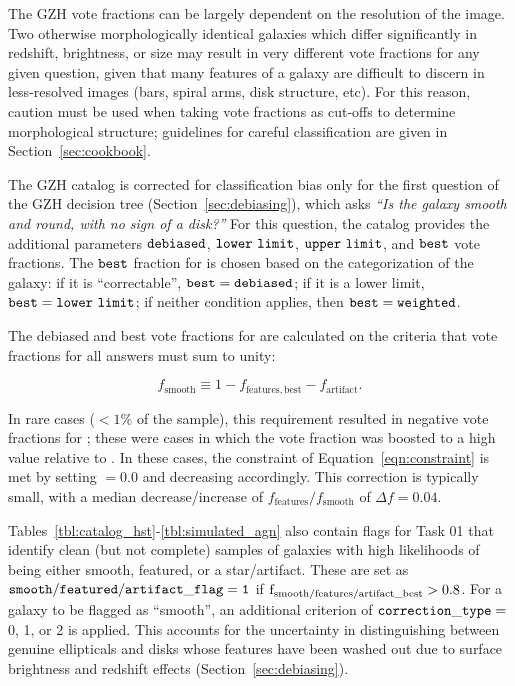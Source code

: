 \documentclass[twocolumn]{aastex6}
\begin{document}
The GZH vote fractions can be largely dependent on the resolution of the image.
Two otherwise morphologically identical galaxies which differ significantly in
redshift, brightness, or size may result in very different vote fractions for
any given question, given that many features of a galaxy are difficult to
discern in less-resolved images (bars, spiral arms, disk structure, etc). For
this reason, caution must be used when taking vote fractions as cut-offs to
determine morphological structure; guidelines for careful classification are
given in Section~\ref{sec:cookbook}. 

The GZH catalog is corrected for classification bias only for the first
question of the GZH decision tree (Section~\ref{sec:debiasing}), which asks
{\it ``Is the galaxy smooth and round, with no sign of a disk?''} For this
question, the catalog provides the additional parameters $\tt debiased$, $\tt
lower~limit$, $\tt upper~limit$, and $\tt best$ vote fractions. The $\tt best$
fraction for \ffeatures{} is chosen based on the categorization of the galaxy:
if it is ``correctable'', $\tt best = debiased$; if it is a lower limit, $\tt
best = lower~limit$; if neither condition applies, then $\tt best = weighted$.

The debiased and best vote fractions for \fsmooth{} are calculated on the
criteria that vote fractions for all answers must sum to unity:

\begin{equation}
f_\mathrm{smooth} \equiv 1 - f_\mathrm{features,best} - f_\mathrm{artifact}.
\label{eqn:constraint}
\end{equation}

\noindent In rare cases ($<1\%$ of the sample), this requirement resulted in
negative vote fractions for \fsmooth; these were cases in which the
\ffeatures{} vote fraction was boosted to a high value relative to \fartifact.
In these cases, the constraint of Equation~\ref{eqn:constraint} is met by
setting \fsmooth$=0.0$ and decreasing \fbest{} accordingly. This correction is
typically small, with a median decrease/increase of
$f_\mathrm{features}/f_\mathrm{smooth}$ of $\Delta f = 0.04$.

Tables~\ref{tbl:catalog_hst}-\ref{tbl:simulated_agn} also contain flags for
Task 01 that identify clean (but not complete) samples of galaxies with high
likelihoods of being either smooth, featured, or a star/artifact.  These are
set as $\tt smooth/featured/artifact\_flag=1$ if $\rm
f_{smooth/features/artifact\_best}>0.8$. For a galaxy to be flagged as
``smooth'', an additional criterion of $\tt correction\_type =~$0, 1, or 2 is
applied. This accounts for the uncertainty in distinguishing between genuine
ellipticals and disks whose features have been washed out due to surface
brightness and redshift effects (Section~\ref{sec:debiasing}).
\end{document}
